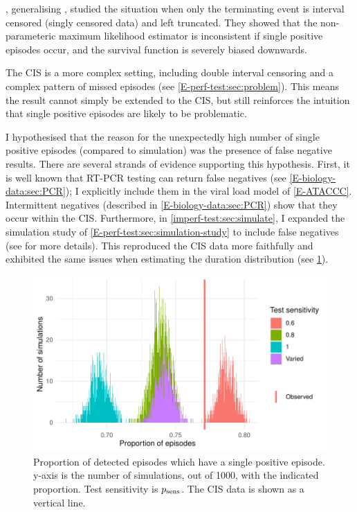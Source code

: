\documentclass[thesis.tex]{subfiles}
\begin{document}
\Textcite{shenNonparametrica}, generalising \textcite{panNote}, studied the situation when only the terminating event is interval censored (\ie singly censored data) and left truncated.
They showed that the non-parameteric maximum likelihood estimator is inconsistent if single positive episodes occur, and the survival function is severely biased downwards.

The CIS is a more complex setting, including double interval censoring and a complex pattern of missed episodes (see \cref{E-perf-test:sec:problem}).
This means the result cannot simply be extended to the CIS, but still reinforces the intuition that single positive episodes are likely to be problematic.

I hypothesised that the reason for the unexpectedly high number of single positive episodes (compared to simulation) was the presence of false negative results.
There are several strands of evidence supporting this hypothesis.
First, it is well known that RT-PCR testing can return false negatives  (see \cref{E-biology-data:sec:PCR}); I explicitly include them in the viral load model of \cref{E-ATACCC}.
Intermittent negatives (described in  \cref{E-biology-data:sec:PCR}) show that they occur within the CIS.
Furthermore, in \cref{imperf-test:sec:simulate}, I expanded the simulation study of \cref{E-perf-test:sec:simulation-study} to include false negatives (see  for more details).
This reproduced the CIS data more faithfully and exhibited the same issues when estimating the duration distribution (see \cref{imperf-test:fig:sim-single-pos}).
\begin{figure}
  \centering \includegraphics{cis-imperfect-testing/sim-single-positive-episodes}
  \caption[Single positive episodes in CIS simulation]{%
    Proportion of detected episodes which have a single positive episode.
    y-axis is the number of simulations, out of 1000, with the indicated proportion.
    Test sensitivity is $p_\text{sens}$.
    The CIS data is shown as a vertical line.
  }
  \label{imperf-test:fig:sim-single-pos}
\end{figure}
\end{document}
